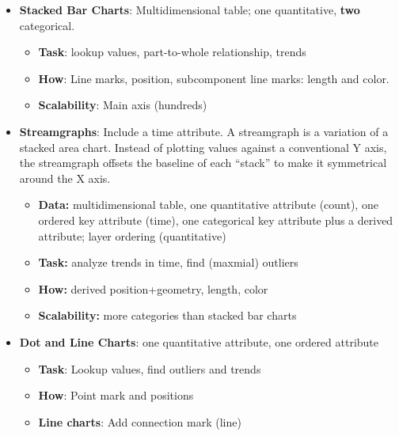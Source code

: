\documentclass{report}
\begin{document}
\begin{itemize}
            \bigbreak \noindent 
            The ordering criteria for the x-axis is alphabetical or using quantitative attribute (bar heights sorted). Scalability is hundreds.
        \item \textbf{Stacked Bar Charts}: Multidimensional table; one quantitative, \textbf{two} categorical.
            \begin{itemize}
                \item \textbf{Task}: lookup values, part-to-whole relationship, trends 
                \item \textbf{How}: Line marks, position, subcomponent line marks: length and color.
                \item \textbf{Scalability}: Main axis (hundreds)
            \end{itemize}
        \item \textbf{Streamgraphs}: Include a time attribute. A streamgraph is a variation of a stacked area chart. Instead of plotting values against a conventional Y axis, the streamgraph offsets the baseline of each “stack” to make it symmetrical around the X axis.
            \begin{itemize}
                \item \textbf{Data:} multidimensional table, one quantitative attribute (count), one ordered key attribute (time), one categorical key attribute 
                    \bigbreak \noindent 
                    plus a  derived attribute; layer ordering (quantitative)
                \item \textbf{Task:} analyze trends in time, find (maxmial) outliers
                \item \textbf{How:} derived position+geometry, length, color
                \item \textbf{Scalability:} more categories than stacked bar charts
            \end{itemize}
            \bigbreak \noindent 
        \item \textbf{Dot and Line Charts}: one quantitative attribute, one ordered attribute
            \begin{itemize}
                \item \textbf{Task}: Lookup values, find outliers and trends
                \item \textbf{How}: Point mark and positions
                \item \textbf{Line charts}: Add connection mark (line)
            \end{itemize}

\end{itemize}
\end{document}
